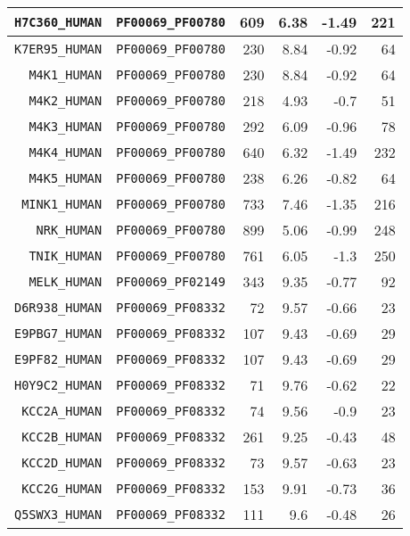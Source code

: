 \begin{longtable}[c]{||r|r|r|r|r|r||}
  \hline
  \texttt{H7C360\_HUMAN} & \texttt{PF00069\_PF00780} & 609 & 6.38 & -1.49 & 221 \\
  \hline
  \texttt{K7ER95\_HUMAN} & \texttt{PF00069\_PF00780} & 230 & 8.84 & -0.92 & 64 \\
  \hline
  \texttt{M4K1\_HUMAN} & \texttt{PF00069\_PF00780} & 230 & 8.84 & -0.92 & 64 \\
  \hline
  \texttt{M4K2\_HUMAN} & \texttt{PF00069\_PF00780} & 218 & 4.93 & -0.7 & 51 \\
  \hline
  \texttt{M4K3\_HUMAN} & \texttt{PF00069\_PF00780} & 292 & 6.09 & -0.96 & 78 \\
  \hline
  \texttt{M4K4\_HUMAN} & \texttt{PF00069\_PF00780} & 640 & 6.32 & -1.49 & 232 \\
  \hline
  \texttt{M4K5\_HUMAN} & \texttt{PF00069\_PF00780} & 238 & 6.26 & -0.82 & 64 \\
  \hline
  \texttt{MINK1\_HUMAN} & \texttt{PF00069\_PF00780} & 733 & 7.46 & -1.35 & 216 \\
  \hline
  \texttt{NRK\_HUMAN} & \texttt{PF00069\_PF00780} & 899 & 5.06 & -0.99 & 248 \\
  \hline
  \texttt{TNIK\_HUMAN} & \texttt{PF00069\_PF00780} & 761 & 6.05 & -1.3 & 250 \\
  \hline
  \texttt{MELK\_HUMAN} & \texttt{PF00069\_PF02149} & 343 & 9.35 & -0.77 & 92 \\
  \hline
  \texttt{D6R938\_HUMAN} & \texttt{PF00069\_PF08332} & 72 & 9.57 & -0.66 & 23 \\
  \hline
  \texttt{E9PBG7\_HUMAN} & \texttt{PF00069\_PF08332} & 107 & 9.43 & -0.69 & 29 \\
  \hline
  \texttt{E9PF82\_HUMAN} & \texttt{PF00069\_PF08332} & 107 & 9.43 & -0.69 & 29 \\
  \hline
  \texttt{H0Y9C2\_HUMAN} & \texttt{PF00069\_PF08332} & 71 & 9.76 & -0.62 & 22 \\
  \hline
  \texttt{KCC2A\_HUMAN} & \texttt{PF00069\_PF08332} & 74 & 9.56 & -0.9 & 23 \\
  \hline
  \texttt{KCC2B\_HUMAN} & \texttt{PF00069\_PF08332} & 261 & 9.25 & -0.43 & 48 \\
  \hline
  \texttt{KCC2D\_HUMAN} & \texttt{PF00069\_PF08332} & 73 & 9.57 & -0.63 & 23 \\
  \hline
  \texttt{KCC2G\_HUMAN} & \texttt{PF00069\_PF08332} & 153 & 9.91 & -0.73 & 36 \\
  \hline
  \texttt{Q5SWX3\_HUMAN} & \texttt{PF00069\_PF08332} & 111 & 9.6 & -0.48 & 26 \\
  \hline

\end{longtable}

